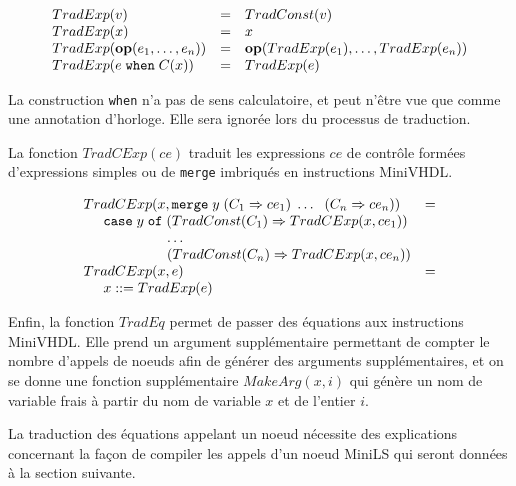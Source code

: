 \documentclass[a4paper]{article}
\newcommand{\mybox}[1]{\mbox{\tt{#1}}}
\newcommand{\ind}[0]{\hspace{0.5cm}}
\newcommand{\coloneqq}[0]{::=}
\newcommand{\Op}[2]{\mybox{\bf{op}}(#1,\dots,#2)}
\newcommand{\When}[3]{#1 \; \mybox{when} \; #2(#3)}
\newcommand{\Merge}[5]{\mybox{merge} \; #1 \; (#2 \Rightarrow #3) \; \dots \; \
  (#4 \Rightarrow #5)}
\newcommand{\Affect}[2]{#1 \coloneqq #2}
\begin{document}
\newcommand{\TradE}[1]{TradExp(#1)}

\[
\begin{array}{lcl}
  \TradE{v} & = & \TradC{v} \\
  \TradE{x} & = & x \\
  \TradE{\Op{e_1}{e_n}} & = & \Op{\TradE{e_1}}{\TradE{e_n}} \\
  \TradE{\When{e}{C}{x}} & = & \TradE{e}
\end{array}
\]

La construction \texttt{when} n'a pas de sens calculatoire, et peut n'être vue
que comme une annotation d'horloge. Elle sera ignorée lors du processus de
traduction.

La fonction $TradCExp(ce)$ traduit les expressions $ce$ de contr\^ole form\'ees
d'expressions simples ou de \texttt{merge} imbriqu\'es en instructions MiniVHDL.

\newcommand{\TradCE}[2]{TradCExp(#1, #2)}

\[
\begin{array}{ll}
  \TradCE{x}{\Merge{y}{C_1}{ce_1}{C_n}{ce_n}} & = \\
  \ind \mathtt{case} \; y \; \mathtt{of} \;
  (\TradC{C_1} \Rightarrow \TradCE{x}{ce_1}) \\
  \hspace{2.1cm} \dots \\
  \hspace{2.1cm} (\TradC{C_n} \Rightarrow \TradCE{x}{ce_n}) \\
  \TradCE{x}{e} & = \\
  \ind \Affect{x}{\TradE{e}}
\end{array}
\]

Enfin, la fonction $TradEq$ permet de passer des \'equations aux instructions
MiniVHDL. Elle prend un argument suppl\'ementaire permettant de compter le nombre
d'appels de noeuds afin de g\'en\'erer des arguments suppl\'ementaires, et on se donne
une fonction suppl\'ementaire $MakeArg(x,i)$ qui g\'en\`ere un nom de variable frais \`a
partir du nom de variable $x$ et de l'entier $i$.

La traduction des \'equations appelant un noeud n\'ecessite des explications
concernant la fa\c{c}on de compiler les appels d'un noeud MiniLS qui seront donn\'ees
\`a la section suivante.

\newcommand{\TradEq}[2]{TradEq(#1,#2)}
\newcommand{\MA}[2]{MakeArg(#1,#2)}
\end{document}
